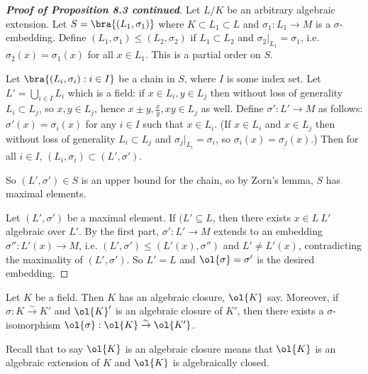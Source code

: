 \begin{proof}[\bf Proof of Proposition 8.3 continued]
Let $L/K$ be an arbitrary algebraic extension. Let $S = \bra{(L_1, \sigma_1)}$ where $K \subset L_1 \subset L$ and $\sigma_1 : L_1 \to M$ is a $\sigma$-embedding. Define $(L_1, \sigma_1) \leq (L_2, \sigma_2)$ if $L_1 \subset L_2$ and $\sigma_2|_{L_1} = \sigma_1$, i.e. $\sigma_2(x) = \sigma_1(x)$ for all $x \in L_1$. This is a partial order on $S$.

Let $\bra{(L_i, \sigma_i) : i \in I}$ be a chain in $S$, where $I$ is some index set. Let $L' = \bigcup_{i\in I} L_i$ which is a field: if $x \in L_i, y \in L_j$ then without loss of generality $L_i \subset L_j$, so $x, y \in L_j$, hence $x \pm y,\frac xy,xy \in L_j$ as well. Define $\sigma' : L' \to M$ as follows: $\sigma'(x) = \sigma_i(x)$ for any $i \in I$ such that $x \in L_i$. (If $x \in L_i$ and $x \in L_j$ then without loss of generality $L_i \subset L_j$ and $\sigma_j |_{L_i} = \sigma_i$, so $\sigma_i(x) = \sigma_j(x)$.) Then for all $i \in I$, $(L_i, \sigma_i) \subset (L', \sigma')$.

So $(L', \sigma') \in S$ is an upper bound for the chain, so by Zorn's lemma, $S$ has maximal elements.

Let $(L', \sigma')$ be a maximal element. If $(L' \subseteq L$, then there exists $x \in L \ L'$ algebraic over $L'$. By the first part, $\sigma' : L' \to M$ extends to an embedding $\sigma'' : L'(x) \to M$, i.e. $(L', \sigma') \leq  (L'(x), \sigma'')$ and $L' \neq  L'(x)$, contradicting the maximality of $(L', \sigma')$. So $L' = L$ and $\ol{\sigma} = \sigma'$ is the desired embedding.
\end{proof}

\begin{theorem}
Let $K$ be a field. Then $K$ has an algebraic closure, $\ol{K}$ say. Moreover, if $\sigma : K \stackrel{\sim}{\to} K'$ and $\ol{K}'$ is an algebraic closure of $K'$, then there exists a $\sigma$-isomorphism $\ol{\sigma} : \ol{K} \stackrel{\sim}{\to} \ol{K'}$.
\end{theorem}

Recall that to say $\ol{K}$ is an algebraic closure means that $\ol{K}$ is an algebraic extension of $K$ and $\ol{K}$ is algebraically closed.

